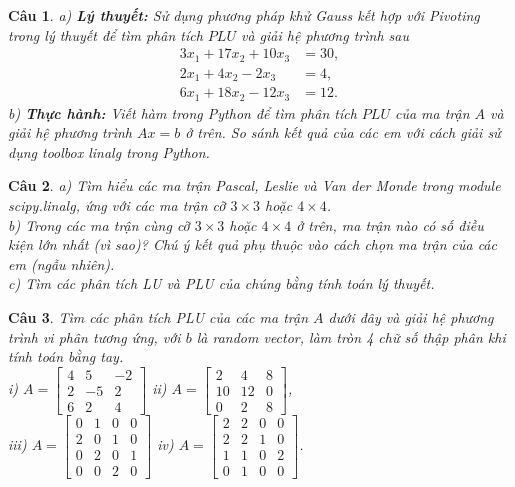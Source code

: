 \documentclass[11pt]{article}
\newtheorem{bt}{Câu}
\newcommand{\m}[1]{\begin{bmatrix}
		#1
\end{bmatrix}}
\begin{document}
\begin{bt} 
a) \textbf{Lý thuyết:} Sử dụng phương pháp khử Gauss kết hợp với Pivoting trong lý thuyết để tìm phân tích $PLU$ và giải hệ phương trình sau
%
\begin{align*}
	3 x_1 + 17 x_2   + 10 x_3   &= 30, \\
	2 x_1 + 4 x_2 - 2 x_3    &= 4, \\
	6 x_1 + 18 x_2 -12 x_3 &= 12. 
\end{align*}
%
b) \textbf{Thực hành:} Viết hàm trong Python để tìm phân tích $PLU$ của ma trận $A$ và giải hệ phương trình $Ax=b$ ở trên. 
So sánh kết quả của các em với cách giải sử dụng toolbox linalg trong Python. 	
\end{bt}

\begin{bt}
a) Tìm hiểu các ma trận Pascal, Leslie và Van der Monde trong module scipy.linalg, ứng với các ma trận cỡ $3\times 3$ hoặc $4 \times 4$. \\
b) Trong các ma trận cùng cỡ $3\times 3$ hoặc $4 \times 4$ ở trên, ma trận nào có số điều kiện lớn nhất (vì sao)? Chú ý kết quả phụ thuộc vào cách chọn ma trận của các em (ngẫu nhiên). \\
c) Tìm các phân tích LU và PLU của chúng bằng tính toán lý thuyết. 
\end{bt}


\newpage 

\begin{bt} Tìm các phân tích PLU của các ma trận $A$ dưới đây và giải hệ phương trình vi phân tương ứng, với $b$ là random vector, làm tròn 4 chữ số thập phân khi tính toán bằng tay. \\
i) $A = \m{4 & 5 & -2 \\ 2 & -5 & 2 \\ 6 & 2 & 4}$ \qquad 
ii) $A = \m{2 & 4 & 8 \\ 10 & 12 & 0 \\ 0 & 2 & 8 }$, \\
iii) $A = \m{0 & 1 & 0 & 0  \\ 2 & 0 & 1 & 0  \\ 0 & 2 & 0 & 1 \\ 0 & 0 & 2 & 0}$ \qquad iv) $A = \m{2 & 2 & 0 & 0  \\ 2 & 2 & 1 & 0  \\ 1 & 1 & 0 & 2 \\ 0 & 1 & 0 & 0}$.	
\end{bt}
\end{document}
